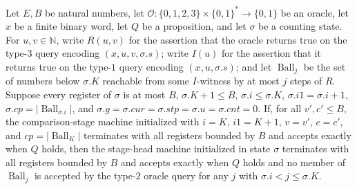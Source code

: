 \begin{theorem}
\label{Complexity.LogProg.ISGen.gstage}
\leanok
{}
Let $E,B$ be natural numbers, let $\mathcal O:\{0,1,2,3\}\times\{0,1\}^*\to\{0,1\}$ be
an oracle, let $x$ be a finite binary word, let $Q$ be a proposition, and let $\sigma$
be a counting state. For $u,v\in\mathbb N$, write $R(u,v)$ for the assertion that the
oracle returns true on the type-$3$ query encoding $(x,u,v,\sigma.s)$; write $I(u)$ for
the assertion that it returns true on the type-$1$ query encoding $(x,u,\sigma.s)$; and
let $\operatorname{Ball}_j$ be the set of numbers below $\sigma.K$ reachable from some
$I$-witness by at most $j$ steps of $R$. Suppose every register of $\sigma$ is at most
$B$, $\sigma.K+1\le B$, $\sigma.i\le\sigma.K$, $\sigma.i1=\sigma.i+1$,
$\sigma.cp=|\operatorname{Ball}_{\sigma.i}|$, and
$\sigma.g=\sigma.cur=\sigma.stp=\sigma.u=\sigma.cnt=0$. If, for all $v',c'\le B$, the
comparison-stage machine initialized with $i=K$, $i1=K+1$, $v=v'$, $c=c'$, and
$cp=|\operatorname{Ball}_K|$ terminates with all registers bounded by $B$ and accepts
exactly when $Q$ holds, then the stage-head machine initialized in state $\sigma$
terminates with all registers bounded by $B$ and accepts exactly when $Q$ holds and no
member of $\operatorname{Ball}_j$ is accepted by the type-$2$ oracle query for any $j$
with $\sigma.i<j\le\sigma.K$.
\end{theorem}
